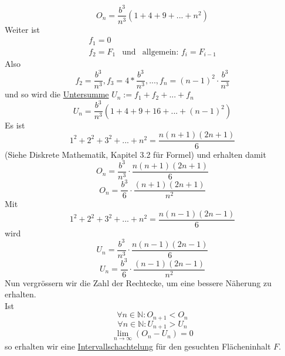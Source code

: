 \documentclass{report}
\begin{document}
\begin{equation}O_n = \frac{b^3}{n^3}(1 + 4 + 9 + ... + n^2)\end{equation}
Weiter ist
\begin{eqnarray}
f_1 = 0 & &\nonumber \\
f_2 = F_1 & \mbox{und} & \mbox{allgemein: } f_i = F_{i-1}\end{eqnarray}
Also
\begin{equation}f_2 = \frac{b^3}{n^3}, f_3 = 4*\frac{b^3}{n^3}, ..., f_n = (n-1)^2 \cdot \frac{b^3}{n^3}\end{equation}
und so wird die \underline{Untersumme} $U_n := f_1 + f_2 + ... + f_n$
\begin{equation}U_n = \frac{b^3}{n^3} (1 + 4 + 9 + 16 + ... + (n-1)^2)\end{equation}
Es ist
\begin{equation}1^2 + 2^2 + 3^2 + ... + n^2 = \frac{n(n+1)(2n+1)}{6}\end{equation}
(Siehe Diskrete Mathematik, Kapitel 3.2 für Formel) und erhalten damit
\begin{equation}O_n = \frac{b^3}{n^3} \cdot \frac{n(n+1)(2n+1)}{6}\end{equation}
\begin{equation}O_n = \frac{b^3}{6} \cdot \frac{(n+1)(2n+1)}{n^2}\end{equation}
Mit
\begin{equation}1^2 + 2^2 + 3^2 + ... + n^2 = \frac{n(n-1)(2n-1)}{6}\end{equation}
wird
\begin{equation}U_n = \frac{b^3}{n^3} \cdot \frac{n(n-1)(2n-1)}{6}\end{equation}
\begin{equation}U_n = \frac{b^3}{6} \cdot \frac{(n-1)(2n-1)}{n^2}\end{equation}
Nun vergrössern wir die Zahl der Rechtecke, um eine bessere Näherung zu erhalten.\\
Ist
\begin{equation}\forall n \in \mathbb{N}: O_{n+1} < O_n \label{intervallschachtelung-1}\end{equation}
\begin{equation}\forall n \in \mathbb{N}: U_{n+1} > U_n \label{intervallschachtelung-2}\end{equation}
\begin{equation}\lim_{n \to \infty} (O_n - U_n) = 0 \label{intervallschachtelung-3}\end{equation}
so erhalten wir eine \underline{Intervallschachtelung} für den gesuchten Flächeninhalt $F$.
\end{document}
